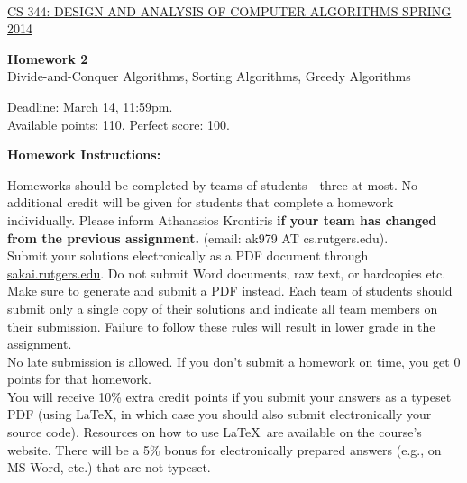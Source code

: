 \documentclass{article}
\begin{document}
\sloppy

\\


\noindent \underline{CS 344: DESIGN AND ANALYSIS OF COMPUTER
  ALGORITHMS \hspace{1.6in} SPRING 2014}

\vspace{0.1in}

\begin{center}
{\bf {\large Homework 2}}\\
Divide-and-Conquer Algorithms, Sorting Algorithms, Greedy Algorithms\\
\end{center}

\vspace{0.1in}

\noindent Deadline: March 14, 11:59pm.\\ 
Available points: 110. Perfect score: 100.\\

\begin{center}
{\bf Homework Instructions:}
\end{center}

 Homeworks should be completed by teams of
students - three at most. No additional credit will be given for
students that complete a homework individually. Please inform
Athanasios Krontiris {\bf if your team has changed from the previous
  assignment.} (email: ak979 AT cs.rutgers.edu).\\

 Submit your solutions electronically
as a PDF document through \url{sakai.rutgers.edu}. Do not submit Word
documents, raw text, or hardcopies etc. Make sure to generate and
submit a PDF instead. Each team of students should submit only a
single copy of their solutions and indicate all team members on their
submission.  Failure to follow these rules will result in lower grade
in the assignment.\\

 No late submission is allowed. If
you don't submit a homework on time, you get 0 points for that
homework.\\

 You will receive 10\% extra
credit points if you submit your answers as a typeset PDF (using
\LaTeX, in which case you should also submit electronically your
source code). Resources on how to use \LaTeX\ are available on the
course's website. There will be a 5\% bonus for electronically
prepared answers (e.g., on MS Word, etc.) that are not typeset.\\
\end{document}
